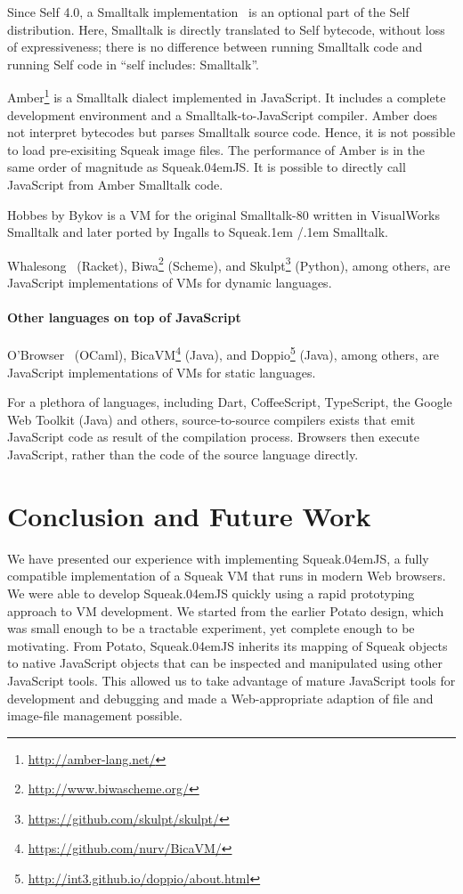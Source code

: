 \documentclass[natbib]{sigplanconf}
\newcommand*\SqueakJS{Squeak\texorpdfstring{\kern.04em}{}JS\xspace}
\newcommand*\SqueakST{Squeak\kern.1em /\kern.1em\penalty0 Smalltalk\xspace}
\newcommand*\JS{JavaScript\xspace}
\begin{document}
Since Self 4.0, a Smalltalk
implementation~\cite{wolczko:1996:self-includes:} is an optional part
of the Self distribution. Here, Smalltalk is directly translated to
Self bytecode, without loss of expressiveness; there is no difference
between running Smalltalk code and running Self code in ``self
includes: Smalltalk''.

Amber\footnote{\url{http://amber-lang.net/}} is a Smalltalk dialect
implemented in \JS. It includes a complete development environment and
a Smalltalk-to-\JS compiler. Amber does not interpret bytecodes but
parses Smalltalk source code. Hence, it is not possible to load
pre-exisiting Squeak image files. The performance of Amber is in the
same order of magnitude as \SqueakJS. It is possible to directly call
\JS from Amber Smalltalk code.

Hobbes by Bykov is a \ac{VM} for the original Smalltalk-80 written in
VisualWorks Smalltalk and later ported by Ingalls to \SqueakST.

Whalesong~\cite{YooKrishnamurthi13} (Racket),
Biwa\footnote{\url{http://www.biwascheme.org/}} (Scheme), and
Skulpt\footnote{\url{https://github.com/skulpt/skulpt/}} (Python),
among others, are \JS implementations of \acp{VM} for dynamic
languages.

\paragraph{Other languages on top of \JS}
\label{sec:other-lang-ontop}

O'Browser~\cite{canou+:2008:obrowser:-objective} (OCaml),
BicaVM\footnote{\url{https://github.com/nurv/BicaVM/}} (Java), and
Doppio\footnote{\url{http://int3.github.io/doppio/about.html}} (Java), among
others, are \JS implementations of \acp{VM} for static languages.

For a plethora of languages, including Dart, CoffeeScript, TypeScript,
the Google Web Toolkit (Java) and others, source-to-source compilers
exists that emit \JS code as result of the compilation
process. Browsers then execute \JS, rather than the code of the source
language directly.


\section{Conclusion and Future Work}
\label{sec:conclusion}

We have presented our experience with implementing \SqueakJS, a fully
compatible implementation of a Squeak \ac{VM} that runs in modern Web
browsers. We were able to develop \SqueakJS quickly using a rapid
prototyping approach to \ac{VM} development. We started from the
earlier Potato design, which was small enough to be a tractable
experiment, yet complete enough to be motivating. From Potato,
\SqueakJS inherits its mapping of Squeak objects to native \JS objects
that can be inspected and manipulated using other \JS tools. This
allowed us to take advantage of mature \JS tools for development and
debugging and made a Web-appropriate adaption of file and image-file
management possible.
\end{document}

